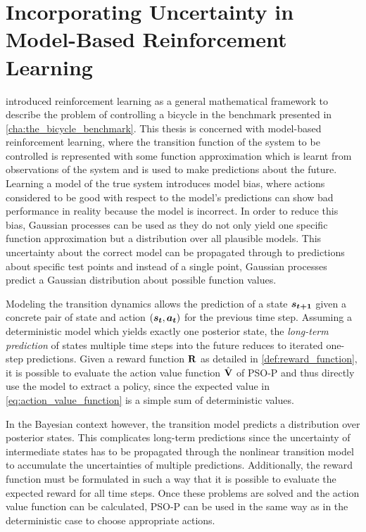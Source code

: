 \chapter{Incorporating Uncertainty in Model-Based Reinforcement Learning}
\label{cha:solution}
 introduced reinforcement learning as a general mathematical framework to describe the problem of controlling a bicycle in the benchmark presented in \cref{cha:the_bicycle_benchmark}.
This thesis is concerned with model-based reinforcement learning, where the transition function of the system to be controlled is represented with some function approximation which is learnt from observations of the system and is used to make predictions about the future.
Learning a model of the true system introduces model bias, where actions considered to be good with respect to the model's predictions can show bad performance in reality because the model is incorrect.
In order to reduce this bias, Gaussian processes can be used as they do not only yield one specific function approximation but a distribution over all plausible models.
This uncertainty about the correct model can be propagated through to predictions about specific test points and instead of a single point, Gaussian processes predict a Gaussian distribution about possible function values.

Modeling the transition dynamics allows the prediction of a state $\bm{s_{t+1}}$ given a concrete pair of state and action $(\bm{s_t}, \bm{a_t})$ for the previous time step.
Assuming a deterministic model which yields exactly one posterior state, the \emph{long-term prediction} of states multiple time steps into the future reduces to iterated one-step predictions.
Given a reward function $\operatorname{\mathbf{R}}$ as detailed in \cref{def:reward_function}, it is possible to evaluate the action value function $\operatorname{\hat{\operatorname{\mathbf{V}}}}$ of PSO-P and thus directly use the model to extract a policy, since the expected value in \cref{eq:action_value_function} is a simple sum of deterministic values.

In the Bayesian context however, the transition model predicts a distribution over posterior states.
This complicates long-term predictions since the uncertainty of intermediate states has to be propagated through the nonlinear transition model to accumulate the uncertainties of multiple predictions.
Additionally, the reward function must be formulated in such a way that it is possible to evaluate the expected reward for all time steps.
Once these problems are solved and the action value function can be calculated, PSO-P can be used in the same way as in the deterministic case to choose appropriate actions.


